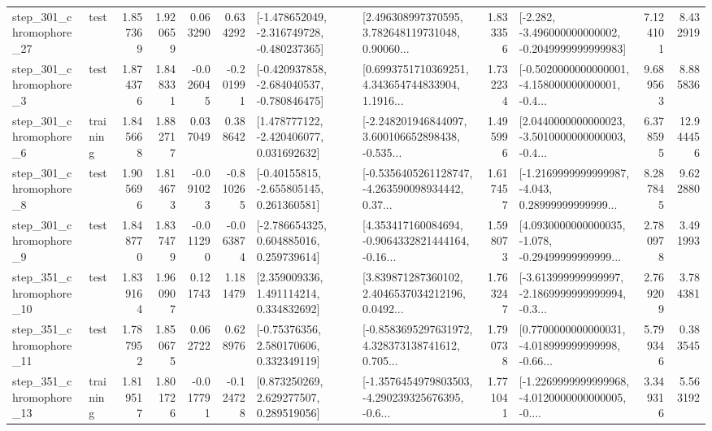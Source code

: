 \begin{tabular}{llrrrrllrlrr}
  step\_301\_chromophore\_27 &      test &      1.857369 &    1.920659 &      0.063290 &  0.634292 &  [-1.478652049, -2.316749728, -0.480237365] &  [2.496308997370595, 3.782648119731048, 0.90060... &       1.833356 &  [-2.282, -3.496000000000002, -0.2049999999999983] &            7.124101 &          8.432919 \\
   step\_301\_chromophore\_3 &      test &      1.874376 &    1.848331 &     -0.026045 & -0.201991 &  [-0.420937858, -2.684040537, -0.780846475] &  [0.6993751710369251, 4.343654744833904, 1.1916... &       1.732234 &  [-0.5020000000000001, -4.158000000000001, -0.4... &            9.689563 &          8.885836 \\
   step\_301\_chromophore\_6 &  training &      1.845668 &    1.882717 &      0.037049 &  0.388642 &    [1.478777122, -2.420406077, 0.031692632] &  [-2.248201946844097, 3.600106652898438, -0.535... &       1.495996 &  [2.0440000000000023, -3.5010000000000003, -0.4... &            6.378595 &         12.944456 \\
   step\_301\_chromophore\_8 &      test &      1.905696 &    1.814673 &     -0.091023 & -0.810265 &    [-0.40155815, -2.655805145, 0.261360581] &  [-0.5356405261128747, -4.263590098934442, 0.37... &       1.617457 &  [-1.2169999999999987, -4.043, 0.28999999999999... &            8.287845 &          9.622880 \\
   step\_301\_chromophore\_9 &      test &      1.848770 &    1.837479 &     -0.011290 & -0.063874 &    [-2.786654325, 0.604885016, 0.259739614] &  [4.353417160084694, -0.9064332821444164, -0.16... &       1.598073 &  [4.0930000000000035, -1.078, -0.29499999999999... &            2.780978 &          3.491993 \\
  step\_351\_chromophore\_10 &      test &      1.839164 &    1.960907 &      0.121743 &  1.181479 &     [2.359009336, 1.491114214, 0.334832692] &  [3.839871287360102, 2.4046537034212196, 0.0492... &       1.763247 &  [-3.613999999999997, -2.1869999999999994, -0.3... &            2.769209 &          3.784381 \\
  step\_351\_chromophore\_11 &      test &      1.787952 &    1.850675 &      0.062722 &  0.628976 &     [-0.75376356, 2.580170606, 0.332349119] &  [-0.8583695297631972, 4.328373138741612, 0.705... &       1.790738 &  [0.7700000000000031, -4.018999999999998, -0.66... &            5.799346 &          0.383545 \\
  step\_351\_chromophore\_13 &  training &      1.819517 &    1.801726 &     -0.017791 & -0.124728 &     [0.873250269, 2.629277507, 0.289519056] &  [-1.3576454979803503, -4.290239325676395, -0.6... &       1.771041 &  [-1.2269999999999968, -4.0120000000000005, -0.... &            3.349316 &          5.563192 \\

\end{tabular}
